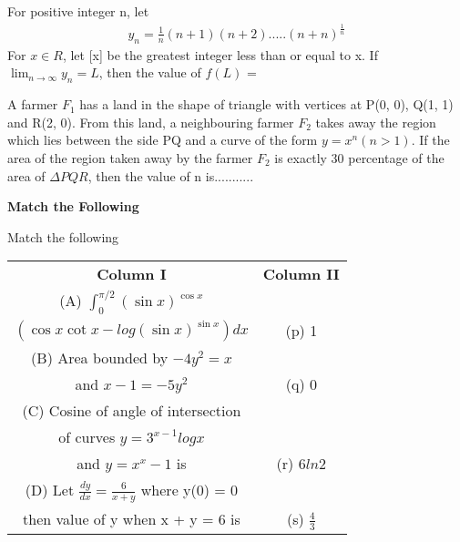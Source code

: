 \item For positive integer n, let
\begin{align*}
y_n = \frac{1}{n}(n + 1)(n + 2).....(n + n)^{\frac{1}{n}}
\end{align*} 
For $x \in R$, let [x] be the greatest integer less than or equal to x. If $\lim_{n \to \infty}y_n = L$, then the value of $f(L)$ =

\item A farmer $F_1$ has a land in the shape of triangle with vertices at P(0, 0), Q(1, 1) and R(2, 0). From this land, a neighbouring farmer $F_2$ takes away the region which lies between the side PQ and a curve of the form $y = x^n(n > 1)$. If the area of the region taken away by the farmer $F_2$ is exactly 30 percentage of the area of $\Delta PQR$, then the value of n is...........

\clearpage

\textbf{Match the Following}

\item Match the following
\begin{table}[ht!]
\centering
\begin{tabular}{c c} 
 \textbf{Column I} & \textbf{Column II}\\ [0.5ex] 
 (A) $\int_{0}^{\pi/2}(\sin x)^{\cos x}$\\ $\left(\cos x\cot x
     - log(\sin x)^{\sin x} \right)dx$                                          &(p) 1\\ 
 (B) Area bounded by $-4y^2 = x$\\ and $x - 1 = -5y^2$                            &(q) 0\\
 (C) Cosine of angle of intersection\\ of curves
     $y = 3^{x-1}log x$\\ and $y = x^x - 1$ is                                      &(r) 6$ln2$\\                                                                     
 (D) Let $\frac{dy}{dx} = \frac{6}{x + y}$ where y(0) = 0\\
     then value of y when x + y = 6 is                                            &(s) $\frac{4}{3}$\\[1ex] 
\end{tabular}
\end{table}\\

